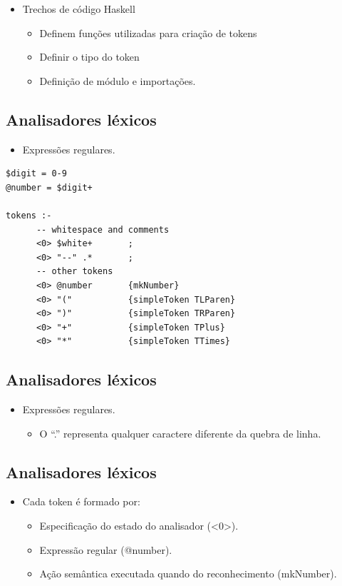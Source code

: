 \documentclass[11pt]{article}
\begin{document}
\begin{itemize}
\item Trechos de código Haskell
\begin{itemize}
\item Definem funções utilizadas para criação de tokens
\item Definir o tipo do token
\item Definição de módulo e importações.
\end{itemize}
\end{itemize}
\subsection*{Analisadores léxicos}
\label{sec:orgfd2d185}

\begin{itemize}
\item Expressões regulares.
\end{itemize}

\begin{verbatim}
$digit = 0-9
@number = $digit+

tokens :-
      -- whitespace and comments
      <0> $white+       ;
      <0> "--" .*       ;
      -- other tokens
      <0> @number       {mkNumber}
      <0> "("           {simpleToken TLParen}
      <0> ")"           {simpleToken TRParen}
      <0> "+"           {simpleToken TPlus}
      <0> "*"           {simpleToken TTimes}
\end{verbatim}
\subsection*{Analisadores léxicos}
\label{sec:orgf88a153}

\begin{itemize}
\item Expressões regulares.
\begin{itemize}
\item O ``.'' representa qualquer caractere diferente da quebra de linha.
\end{itemize}
\end{itemize}
\subsection*{Analisadores léxicos}
\label{sec:org7cfd77b}

\begin{itemize}
\item Cada token é formado por:
\begin{itemize}
\item Especificação do estado do analisador (<0>).
\item Expressão regular (@number).
\item Ação semântica executada quando do reconhecimento (mkNumber).
\end{itemize}
\end{itemize}
\end{document}
